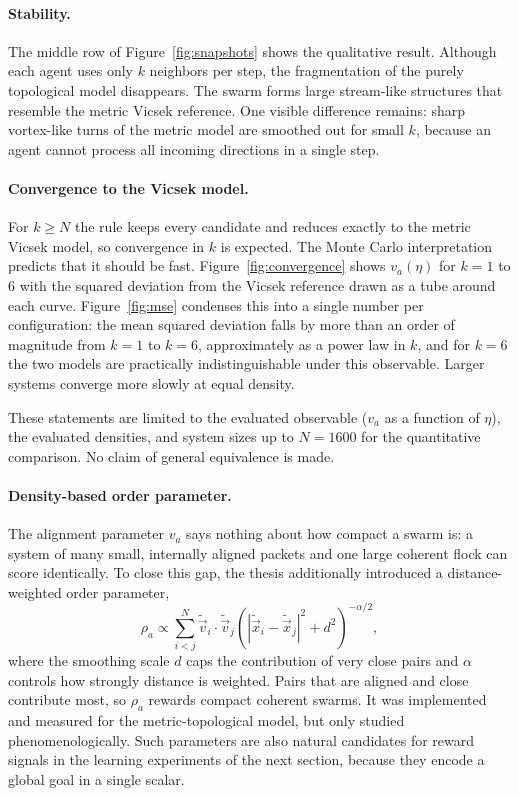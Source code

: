 \documentclass[10pt,a4paper,twocolumn]{article}
\begin{document}
\paragraph{Stability.}
The middle row of Figure~\ref{fig:snapshots} shows the qualitative
result. Although each agent uses only $k$ neighbors per step, the
fragmentation of the purely topological model disappears. The swarm
forms large stream-like structures that resemble the metric Vicsek
reference. One visible difference remains: sharp vortex-like turns of
the metric model are smoothed out for small $k$, because an agent
cannot process all incoming directions in a single step.

\paragraph{Convergence to the Vicsek model.}
For $k \geq N$ the rule keeps every candidate and reduces exactly to
the metric Vicsek model, so convergence in $k$ is expected. The
Monte Carlo interpretation predicts that it should be fast.
Figure~\ref{fig:convergence} shows $v_a(\eta)$ for $k=1$ to $6$ with
the squared deviation from the Vicsek reference drawn as a tube
around each curve. Figure~\ref{fig:mse} condenses this into a single
number per configuration: the mean squared deviation falls by more
than an order of magnitude from $k=1$ to $k=6$, approximately as a
power law in $k$, and for $k=6$ the two models are practically
indistinguishable under this observable. Larger systems converge
more slowly at equal density.

These statements are limited to the evaluated observable
($v_a$ as a function of $\eta$), the evaluated densities, and system
sizes up to $N=1600$ for the quantitative comparison. No claim of
general equivalence is made.

\paragraph{Density-based order parameter.}
The alignment parameter $v_a$ says nothing about how compact a swarm
is: a system of many small, internally aligned packets and one large
coherent flock can score identically. To close this gap, the thesis
additionally introduced a distance-weighted order parameter,
\begin{equation}
    \rho_a \propto
    \sum_{i<j}^{N} \tilde{\vec{v}}_i \cdot \tilde{\vec{v}}_j
    \left( \left|\tilde{\vec{x}}_i - \tilde{\vec{x}}_j\right|^2
    + d^2 \right)^{-\alpha/2},
    \label{eq:densityop}
\end{equation}
where the smoothing scale $d$ caps the contribution of very close
pairs and $\alpha$ controls how strongly distance is weighted. Pairs
that are aligned and close contribute most, so $\rho_a$ rewards
compact coherent swarms. It was implemented and measured for the
metric-topological model, but only studied phenomenologically. Such
parameters are also natural candidates for reward signals in the
learning experiments of the next section, because they encode a
global goal in a single scalar.
\end{document}
